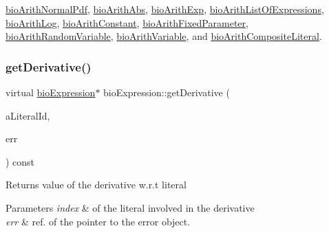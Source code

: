 \hyperlink{classbio_arith_normal_pdf_af001f9bda79d1518e2c9913c02f98a37}{bio\+Arith\+Normal\+Pdf}, \hyperlink{classbio_arith_abs_a6b39360611c4dbb11ac38c501285c4b9}{bio\+Arith\+Abs}, \hyperlink{classbio_arith_exp_aec1900d14fe80411c3322358773c7ac6}{bio\+Arith\+Exp}, \hyperlink{classbio_arith_list_of_expressions_af13c0c6710776c02d3f7c0e27d5cd724}{bio\+Arith\+List\+Of\+Expressions}, \hyperlink{classbio_arith_log_a1717f06ff8d70f5285272ee66c669174}{bio\+Arith\+Log}, \hyperlink{classbio_arith_constant_af2f4fed6a41757d2cfa06a06b4d16923}{bio\+Arith\+Constant}, \hyperlink{classbio_arith_fixed_parameter_a91c2dcaf2be8731defb45a02108b7b82}{bio\+Arith\+Fixed\+Parameter}, \hyperlink{classbio_arith_random_variable_a258a34932273d07449117a20704e7811}{bio\+Arith\+Random\+Variable}, \hyperlink{classbio_arith_variable_a13698945a07c98905254d7e773555de3}{bio\+Arith\+Variable}, and \hyperlink{classbio_arith_composite_literal_aff5a7801055d4691dcc1ee84cc9fa201}{bio\+Arith\+Composite\+Literal}.

\mbox{\label{classbio_expression_a5915579d1193f25f216c1e273c97f2ce}} 
\subsubsection{\texorpdfstring{get\+Derivative()}{getDerivative()}}
{\footnotesize\ttfamily virtual \hyperlink{classbio_expression}{bio\+Expression}$\ast$ bio\+Expression\+::get\+Derivative (\begin{DoxyParamCaption}\item[{pat\+U\+Long}]{a\+Literal\+Id,  }\item[{pat\+Error $\ast$\&}]{err }\end{DoxyParamCaption}) const\hspace{0.3cm}{\ttfamily [virtual]}}

\begin{DoxyReturn}{Returns}
value of the derivative w.\+r.\+t literal 
\end{DoxyReturn}

\begin{DoxyParams}{Parameters}
{\em index} & of the literal involved in the derivative \\
\hline
{\em err} & ref. of the pointer to the error object. \\
\hline
\end{DoxyParams}


